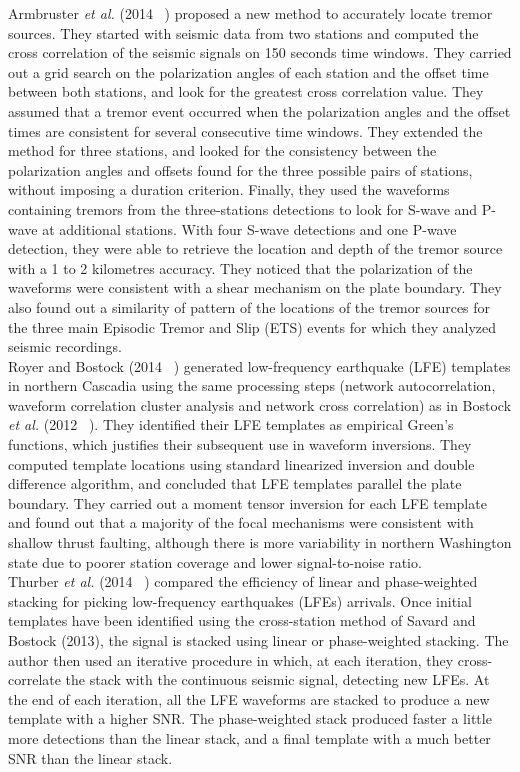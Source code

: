 \documentclass[main.tex]{subfiles}
\begin{document}
Armbruster \textit{et al.} (2014 ~\cite{ARM_2014}) proposed a new method to accurately locate tremor sources. They started with seismic data from two stations and computed the cross correlation of the seismic signals on 150 seconds time windows. They carried out a grid search on the polarization angles of each station and the offset time between both stations, and look for the greatest cross correlation value. They assumed that a tremor event occurred when the polarization angles and the offset times are consistent for several consecutive time windows. They extended the method for three stations, and looked for the consistency between the polarization angles and offsets found for the three possible pairs of stations, without imposing a duration criterion. Finally, they used the waveforms containing tremors from the three-stations detections to look for S-wave and P-wave at additional stations. With four S-wave detections and one P-wave detection, they were able to retrieve the location and depth of the tremor source with a 1 to 2 kilometres accuracy. They noticed that the polarization of the waveforms were consistent with a shear mechanism on the plate boundary. They also found out a similarity of pattern of the locations of the tremor sources for the three main Episodic Tremor and Slip (ETS) events for which they analyzed seismic recordings. \\

Royer and Bostock (2014 ~\cite{ROY_2014}) generated low-frequency earthquake (LFE) templates in northern Cascadia using the same processing steps (network autocorrelation, waveform correlation cluster analysis and network cross correlation) as in Bostock \textit{et al.} (2012 ~\cite{BOS_2012}). They identified their LFE templates as empirical Green's functions, which justifies their subsequent use in waveform inversions. They computed template locations using standard linearized inversion and double difference algorithm, and concluded that LFE templates parallel the plate boundary. They carried out a moment tensor inversion for each LFE template and found out that a majority of the focal mechanisms were consistent with shallow thrust faulting, although there is more variability in northern Washington state due to poorer station coverage and lower signal-to-noise ratio. \\

Thurber \textit{et al.} (2014 ~\cite{THU_2014}) compared the efficiency of linear and phase-weighted stacking for picking low-frequency earthquakes (LFEs) arrivals. Once initial templates have been identified using the cross-station method of Savard and Bostock (2013), the signal is stacked using linear or phase-weighted stacking. The author then used an iterative procedure in which, at each iteration, they cross-correlate the stack with the continuous seismic signal, detecting new LFEs. At the end of each iteration, all the LFE waveforms are stacked to produce a new template with a higher SNR. The phase-weighted stack produced faster a little more detections than the linear stack, and a final template with a much better SNR than the linear stack. \\
\end{document}
